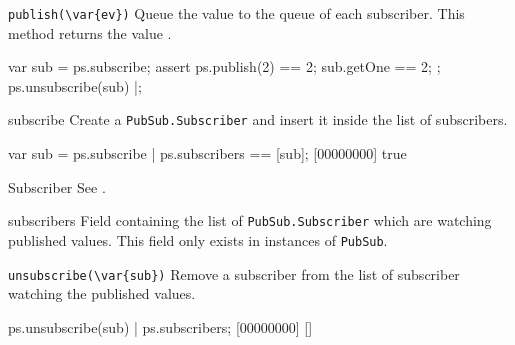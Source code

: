\begin{urbiscriptapi}

\item \lstinline|publish(\var{ev})|
  Queue the value  to the queue of each subscriber.  This method
  returns the value .

\begin{urbiscript}
{
  var sub = ps.subscribe;
  assert
  {
    ps.publish(2) == 2;
    sub.getOne == 2;
  };
  ps.unsubscribe(sub)
}|;
\end{urbiscript}

\item[subscribe]
  Create a \lstinline|PubSub.Subscriber| and insert it inside the list of
  subscribers.

\begin{urbiscript}
var sub = ps.subscribe |
ps.subscribers == [sub];
[00000000] true
\end{urbiscript}

\item[Subscriber] See .

\item[subscribers]
  Field containing the list of \lstinline|PubSub.Subscriber| which are
  watching published values.  This field only exists in instances of
  \lstinline|PubSub|.

\item \lstinline|unsubscribe(\var{sub})|
  Remove a subscriber from the list of subscriber watching the published
  values.

\begin{urbiscript}
ps.unsubscribe(sub) |
ps.subscribers;
[00000000] []
\end{urbiscript}


\end{urbiscriptapi}

